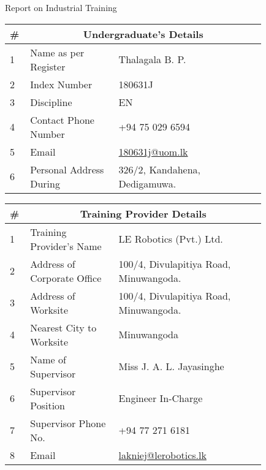 \begin{center}
	{\large Report on Industrial Training}
\end{center}


\vspace{10mm}

\begin{center}
	\begin{tabular}{|p{0.03\linewidth}  |p{0.3\linewidth}  |p{0.5\linewidth}  |}
	\hline 
	\# & \multicolumn{2}{c|}{\textbf{Undergraduate's Details}}\\ \hline
	1 & Name as per Register & Thalagala B. P. \\ \hline
	2 & Index Number & 180631J \\ \hline
	3 & Discipline & EN \\ \hline
	4 & Contact Phone Number & +94 75 029 6594 \\ \hline
	5 & Email & \href{180631j@uom.lk}{180631j@uom.lk} \\ \hline
	6 & Personal Address During & 326/2, Kandahena, Dedigamuwa. \\ \hline

\end{tabular}
\end{center}


\begin{center}
	\begin{tabular}{|p{0.03\linewidth}  |p{0.3\linewidth}  |p{0.5\linewidth}  |}
		\hline 
		\# & \multicolumn{2}{c|}{\textbf{Training Provider Details}}\\ \hline
		1 & Training Provider’s Name & LE Robotics (Pvt.) Ltd. \\ \hline
		2 & Address of Corporate Office & 100/4, Divulapitiya Road, Minuwangoda. \\ \hline
		3 & Address of Worksite & 100/4, Divulapitiya Road, Minuwangoda. \\ \hline
		4 & Nearest City to Worksite & Minuwangoda \\ \hline
		5 & Name of Supervisor & Miss J. A. L. Jayasinghe \\ \hline
		6 & Supervisor Position & Engineer In-Charge \\ \hline
		7 & Supervisor Phone No. & +94 77 271 6181 \\ \hline
		8 & Email & \href{lakniej@lerobotics.lk}{lakniej@lerobotics.lk} \\ \hline
		
	\end{tabular}
\end{center}